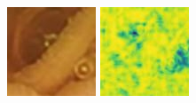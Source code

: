 \documentclass[conference]{IEEEtran}
\begin{document}
\begin{figure}[!t]
    \endminipage\hfill
        \centering
        \includegraphics[width=\linewidth]{Figures/520/520_proposed.jpg}
        
        \vfill
        \includegraphics[width=\linewidth]{Figures/520/520_proposed_ssim.jpg}
        

\end{figure}
\end{document}
